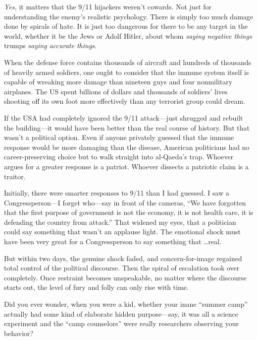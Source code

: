 {
 \textit{Yes,} it matters that the 9/11 hijackers
weren't cowards. Not just for understanding the
enemy's realistic psychology. There is simply too much
damage done by spirals of hate. It is just too dangerous for there to
be any target in the world, whether it be the Jews or Adolf Hitler,
about whom \textit{saying negative things} trumps \textit{saying
accurate things}.}

{
 When the defense force contains thousands of aircraft and hundreds
of thousands of heavily armed soldiers, one ought to consider that the
immune system itself is capable of wreaking more damage than nineteen
guys and four nonmilitary airplanes. The US spent billions of dollars
and thousands of soldiers' lives shooting off its own
foot more effectively than any terrorist group could dream.}

{
 If the USA had completely ignored the 9/11 attack---just shrugged
and rebuilt the building---it would have been better than the real
course of history. But that wasn't a political option.
Even if anyone privately guessed that the immune response would be more
damaging than the disease, American politicians had no
career-preserving choice but to walk straight into
al-Qaeda's trap. Whoever argues for a greater response
is a patriot. Whoever dissects a patriotic claim is a traitor.}

{
 Initially, there were smarter responses to 9/11 than I had
guessed. I saw a Congressperson---I forget who---say in front of the
cameras, ``We have forgotten that the first purpose of
government is not the economy, it is not health care, it is defending
the country from attack.'' That widened my eyes, that
a politician could say something that wasn't an
applause light. The emotional shock must have been very great for a
Congressperson to say something that \ldots real.}

{
 But within two days, the genuine shock faded, and
concern-for-image regained total control of the political discourse.
Then the spiral of escalation took over completely. Once restraint
becomes unspeakable, no matter where the discourse starts out, the
level of fury and folly can only rise with time.}

\myendsectiontext


{
 Did you ever wonder, when you were a kid, whether your inane
``summer camp'' actually had some
kind of elaborate hidden purpose---say, it was all a science experiment
and the ``camp counselors'' were
really researchers observing your behavior? }

